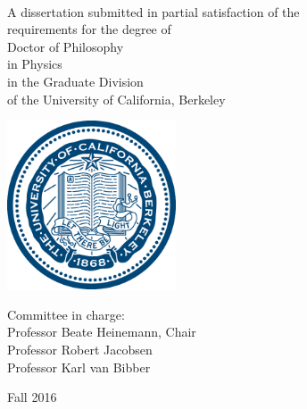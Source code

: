 
\begin{titlepage}

\begin{center}
\large

\hfill
\vfill

\begingroup
\color{RoyalBlue}\spacedallcaps{\myTitle} \\ \bigskip %
\endgroup

\spacedlowsmallcaps{\myName} %

\vfill

A dissertation submitted in partial satisfaction of the \\
requirements for the degree of \\
Doctor of Philosophy \\
in Physics \\
in the Graduate Division \\
of the University of California, Berkeley \\

\vfill

\includegraphics[width=5cm]{gfx/ucberkeleyseal_line_540.eps} \\ 
\bigskip %

Committee in charge: \\
Professor Beate Heinemann, Chair \\
Professor Robert Jacobsen \\
Professor Karl van Bibber \\ \bigskip

Fall 2016



\vfill

\end{center}

\end{titlepage}
